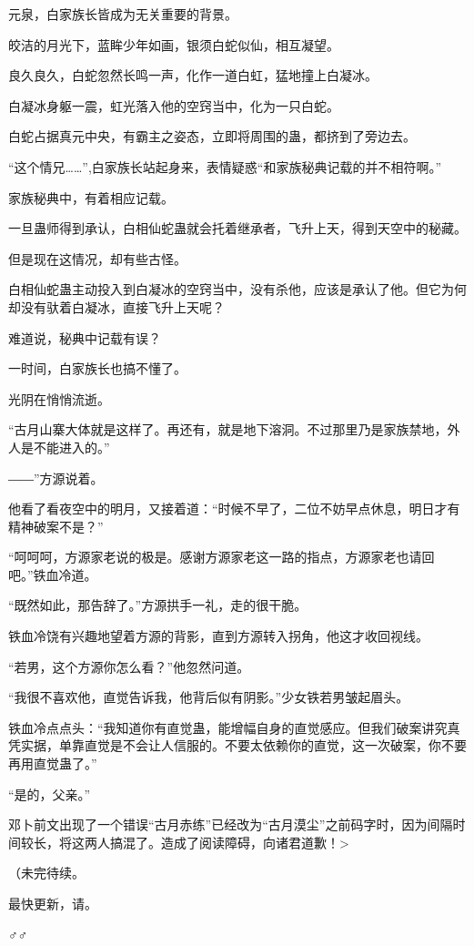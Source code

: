\begin{this_body}
元泉，白家族长皆成为无关重要的背景。

皎洁的月光下，蓝眸少年如画，银须白蛇似仙，相互凝望。

良久良久，白蛇忽然长鸣一声，化作一道白虹，猛地撞上白凝冰。

白凝冰身躯一震，虹光落入他的空窍当中，化为一只白蛇。

白蛇占据真元中央，有霸主之姿态，立即将周围的蛊，都挤到了旁边去。

“这个情兄……”,白家族长站起身来，表情疑惑“和家族秘典记载的并不相符啊。”

家族秘典中，有着相应记载。

一旦蛊师得到承认，白相仙蛇蛊就会托着继承者，飞升上天，得到天空中的秘藏。

但是现在这情况，却有些古怪。

白相仙蛇蛊主动投入到白凝冰的空窍当中，没有杀他，应该是承认了他。但它为何却没有驮着白凝冰，直接飞升上天呢？

难道说，秘典中记载有误？

一时间，白家族长也搞不懂了。

光阴在悄悄流逝。

“古月山寨大体就是这样了。再还有，就是地下溶洞。不过那里乃是家族禁地，外人是不能进入的。”

――”方源说着。

他看了看夜空中的明月，又接着道：“时候不早了，二位不妨早点休息，明日才有精神破案不是？”

“呵呵呵，方源家老说的极是。感谢方源家老这一路的指点，方源家老也请回吧。”铁血冷道。

“既然如此，那告辞了。”方源拱手一礼，走的很干脆。

铁血冷饶有兴趣地望着方源的背影，直到方源转入拐角，他这才收回视线。

“若男，这个方源你怎么看？”他忽然问道。

“我很不喜欢他，直觉告诉我，他背后似有阴影。”少女铁若男皱起眉头。

铁血冷点点头：“我知道你有直觉蛊，能增幅自身的直觉感应。但我们破案讲究真凭实据，单靠直觉是不会让人信服的。不要太依赖你的直觉，这一次破案，你不要再用直觉蛊了。”

“是的，父亲。”

邓卜前文出现了一个错误“古月赤练”已经改为“古月漠尘”之前码字时，因为间隔时间较长，将这两人搞混了。造成了阅读障碍，向诸君道歉！>

（未完待续。

最快更新，请。

♂♂

\end{this_body}

